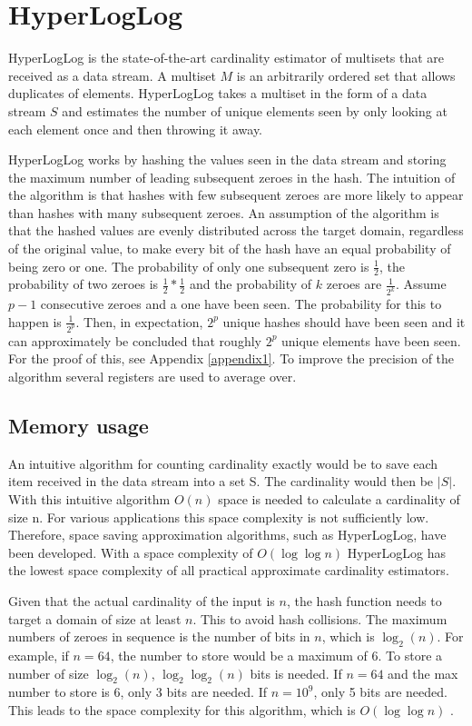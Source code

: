 \section{HyperLogLog}
HyperLogLog \cite{hyperloglog} is the state-of-the-art cardinality estimator of multisets that are received as a data stream. A multiset $M$ is an arbitrarily ordered set that allows duplicates of elements. HyperLogLog takes a multiset in the form of a data stream $S$ and estimates the number of unique elements seen by only looking at each element once and then throwing it away. 

HyperLogLog works by hashing the values seen in the data stream and storing the maximum number of leading subsequent zeroes in the hash. The intuition of the algorithm is that hashes with few subsequent zeroes are more likely to appear than hashes with many subsequent zeroes. An assumption of the algorithm is that the hashed values are evenly distributed across the target domain, regardless of the original value, to make every bit of the hash have an equal probability of being zero or one. The probability of only one subsequent zero is $\frac{1}{2}$, the probability of two zeroes is $\frac{1}{2}*\frac{1}{2}$ and the probability of $k$ zeroes are $\frac {1} {2^k}$. Assume $p-1$ consecutive zeroes and a one have been seen. The probability for this to happen is $\frac{1}{2^p}$. Then, in expectation, $2^p$ unique hashes should have been seen and it can approximately be concluded that roughly $2^p$ unique elements have been seen. For the proof of this, see Appendix \ref{appendix1}. To improve the precision of the algorithm several registers are used to average over. 

\subsection{Memory usage}
An intuitive algorithm for counting cardinality exactly would be to save each item received in the data stream into a set S. The cardinality would then be $|S|$. With this intuitive algorithm $O(n)$ space is needed to calculate a cardinality of size n. For various applications this space complexity is not sufficiently low. Therefore, space saving approximation algorithms, such as HyperLogLog, have been developed. With a space complexity of $O(\log\log n)$ HyperLogLog has the lowest space complexity of all practical approximate cardinality estimators. 

Given that the actual cardinality of the input is $n$, the hash function needs to target a domain of size at least $n$. This to avoid hash collisions. The maximum numbers of zeroes in sequence is the number of bits in $n$, which is $\log_2(n)$. For example, if $n=64$, the number to store would be a maximum of 6. To store a number of size $\log_2(n)$, $\log_2\log_2(n)$ bits is needed. If $n=64$ and the max number to store is 6, only 3 bits are needed. If $n=10^9$, only 5 bits are needed. This leads to the space complexity for this algorithm, which is $O(\log\log n)$ \cite{hyperloglog}. 

